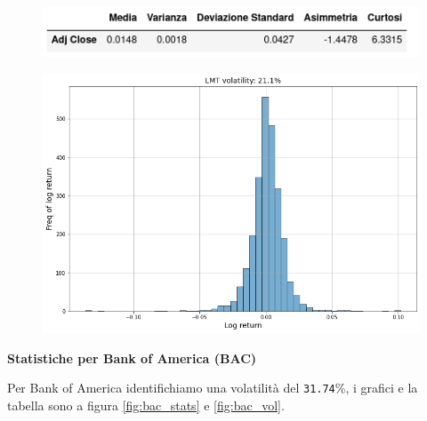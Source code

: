\documentclass{article}
\begin{document}
\begin{figure}[h]
  \centering
  \begin{minipage}{.5\textwidth}
    \centering
    \vspace{4.35cm}
    \includegraphics[width=1\linewidth]{lmt_stats.png}
    \label{fig:lmt_stats}
  \end{minipage}%
  \begin{minipage}{.5\textwidth}
    \centering
    \includegraphics[width=1\linewidth]{lmt_volatility.png}
    \label{fig:lmt_vol}
  \end{minipage}
\end{figure}

\pagebreak

\textbf{Statistiche per Bank of America (BAC)}

Per Bank of America identifichiamo una volatilità del \verb|31.74|\%, i grafici e la tabella sono a figura \ref{fig:bac_stats} e \ref{fig:bac_vol}.
\end{document}
